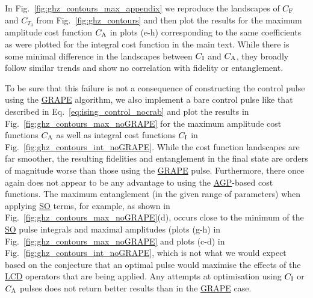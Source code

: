 \documentclass[a4paper,oneside,11pt]{book}
\newcommand{\acrref}[1]{\hyperref[acr:#1]{#1}}
\begin{document}
In Fig.~\ref{fig:ghz_contours_max_appendix} we reproduce the landscapes of $C_{\rm F}$ and $C_{T_3}$ from Fig.~\ref{fig:ghz_contours} and then plot the results for the maximum amplitude cost function $C_{\rm A}$ in plots (e-h) corresponding to the same coefficients as were plotted for the integral cost function in the main text. While there is some minimal difference in the landscapes between $C_{\rm I}$ and $C_{\rm A}$, they broadly follow similar trends and show no correlation with fidelity or entanglement.

To be sure that this failure is not a consequence of constructing the control pulse using the \acrref{GRAPE} algorithm, we also implement a bare control pulse like that described in Eq.~\eqref{eq:ising_control_nocrab} and plot the results in Fig.~\ref{fig:ghz_contours_max_noGRAPE} for the maximum amplitude cost functions $C_{\rm A}$ as well as integral cost functions $C_{\rm I}$ in Fig.~\ref{fig:ghz_contours_int_noGRAPE}. While the cost function landscapes are far smoother, the resulting fidelities and entanglement in the final state are orders of magnitude worse than those using the \acrref{GRAPE} pulse. Furthermore, there once again does not appear to be any advantage to using the \acrref{AGP}-based cost functions. The maximum entanglement (in the given range of parameters) when applying \acrref{SO} terms, for example, as shown in Fig.~\ref{fig:ghz_contours_max_noGRAPE}(d), occurs close to the minimum of the \acrref{SO} pulse integrals and maximal amplitudes (plots (g-h) in Fig.~\ref{fig:ghz_contours_max_noGRAPE} and plots (c-d) in Fig.~\ref{fig:ghz_contours_int_noGRAPE}, which is not what we would expect based on the conjecture that an optimal pulse would maximise the effects of the \acrref{LCD} operators that are being applied. Any attempts at optimisation using $C_{\rm I}$ or $C_{\rm A}$ pulses does not return better results than in the \acrref{GRAPE} case.
\end{document}
